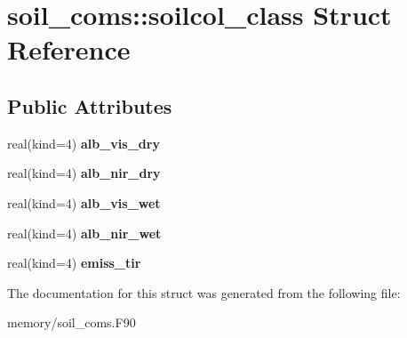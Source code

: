 \hypertarget{structsoil__coms_1_1soilcol__class}{
\section{soil\_\-coms::soilcol\_\-class Struct Reference}
\label{structsoil__coms_1_1soilcol__class}
}
\subsection*{Public Attributes}
\begin{DoxyCompactItemize}
\item 
\hypertarget{structsoil__coms_1_1soilcol__class_a26fb51ecc2f4d51c9dcffaf003a91f2a}{
real(kind=4) {\bfseries alb\_\-vis\_\-dry}}
\label{structsoil__coms_1_1soilcol__class_a26fb51ecc2f4d51c9dcffaf003a91f2a}

\item 
\hypertarget{structsoil__coms_1_1soilcol__class_a0199326ae49fca06646d39217cc389f8}{
real(kind=4) {\bfseries alb\_\-nir\_\-dry}}
\label{structsoil__coms_1_1soilcol__class_a0199326ae49fca06646d39217cc389f8}

\item 
\hypertarget{structsoil__coms_1_1soilcol__class_a38d9b036b4fca3d4b3c23d5a19a4e7df}{
real(kind=4) {\bfseries alb\_\-vis\_\-wet}}
\label{structsoil__coms_1_1soilcol__class_a38d9b036b4fca3d4b3c23d5a19a4e7df}

\item 
\hypertarget{structsoil__coms_1_1soilcol__class_aafaed831a367d9dfa55f84402cbcc119}{
real(kind=4) {\bfseries alb\_\-nir\_\-wet}}
\label{structsoil__coms_1_1soilcol__class_aafaed831a367d9dfa55f84402cbcc119}

\item 
\hypertarget{structsoil__coms_1_1soilcol__class_a62a2febe4a46fb016a2ddaf87f24621f}{
real(kind=4) {\bfseries emiss\_\-tir}}
\label{structsoil__coms_1_1soilcol__class_a62a2febe4a46fb016a2ddaf87f24621f}

\end{DoxyCompactItemize}


The documentation for this struct was generated from the following file:\begin{DoxyCompactItemize}
\item 
memory/soil\_\-coms.F90\end{DoxyCompactItemize}
